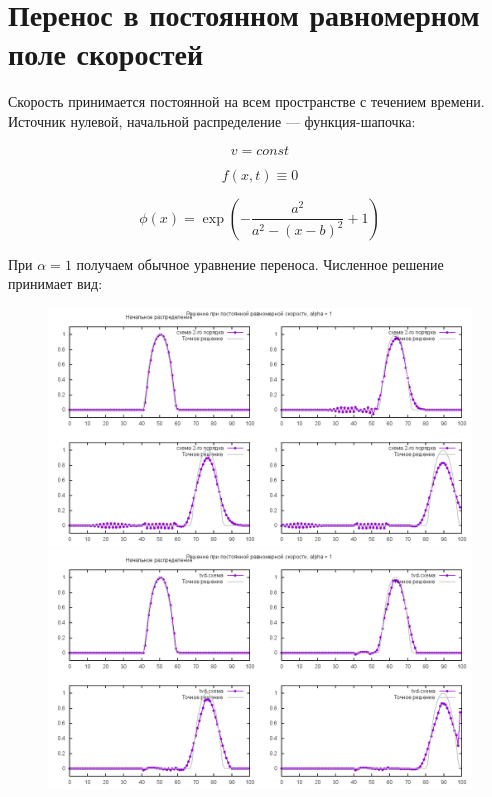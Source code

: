 \section{Перенос в постоянном равномерном поле скоростей}

Скорость принимается постоянной на всем пространстве с течением времени. Источник нулевой, начальной распределение --- функция-шапочка:

\begin{equation}
	v = const
\end{equation}


\begin{equation}
	f(x,t) \equiv 0
\end{equation}

\begin{equation}
	\phi(x) = \exp\left(-\frac{a^2}{a^2 - \left(x-b\right)^2} + 1\right)
\end{equation}

При $\alpha = 1$ получаем обычное уравнение переноса. Численное решение принимает вид:

\begin{figure}[h]
	\includegraphics[width=1.2\linewidth]{pics/alpha1_notvd}
	\includegraphics[width=1.2\linewidth]{pics/alpha1_tvd}
\end{figure}

